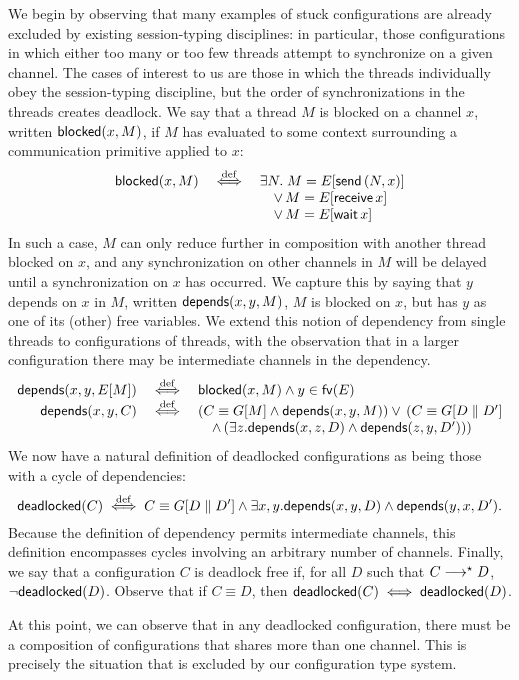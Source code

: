 \documentclass[oribibl,orivec,envcountsame]{llncs}
\begin{document}
We begin by observing that many examples of stuck configurations are already excluded by existing
session-typing disciplines: in particular, those configurations in which either too many or too few
threads attempt to synchronize on a given channel.  The cases of interest to us are those in which
the threads individually obey the session-typing discipline, but the order of synchronizations in
the threads creates deadlock.  We say that a thread $M$ is blocked on a channel $x$, written
$\mathsf{blocked}(x,M)$, if $M$ has evaluated to some context surrounding a communication primitive applied
to $x$:
%
\[\begin{array}{rcl}
  \mathsf{blocked}(x,M) &\stackrel{\mathrm{def}}{\iff}& \exists N. \; M = E[\mathsf{send} \, (N,x)] \\
  && \quad \lor \, M = E[\mathsf{receive} \, x] \\
  && \quad \lor \, M = E[\mathsf{wait} \, x]
\end{array}\]
%
In such a case, $M$ can only reduce further in composition with another thread blocked on $x$, and
any synchronization on other channels in $M$ will be delayed until a synchronization on $x$ has
occurred.  We capture this by saying that $y$ depends on $x$ in $M$, written $\mathsf{depends}(x,y,M)$, $M$ is
blocked on $x$, but has $y$ as one of its (other) free variables.  We extend this notion of
dependency from single threads to configurations of threads, with the observation that in a larger
configuration there may be intermediate channels in the dependency.
\[\begin{array}{rcl}
  \mathsf{depends}(x,y,E[M]) &\stackrel{\mathrm{def}}{\iff}& \mathsf{blocked}(x,M) \land y \in \mathsf{fv}(E) \\
  \mathsf{depends}(x,y,C) &\stackrel{\mathrm{def}}{\iff}& (C \equiv G[M] \land \mathsf{depends}(x,y,M)) \lor \, (C \equiv G[D \parallel D'] \\
  && \quad \land \, (\exists z. \mathsf{depends}(x,z,D) \land \mathsf{depends}(z,y,D')))
\end{array}\]
%
We now have a natural definition of deadlocked configurations as being those with a cycle of
dependencies:
%
\[
\mathsf{deadlocked}(C) \stackrel{\mathrm{def}}{\iff} C \equiv G[D \parallel D'] \land \exists x,y. \mathsf{depends}(x,y,D) \land \mathsf{depends}(y,x,D').
\]
%
Because the definition of dependency permits intermediate channels, this definition encompasses
cycles involving an arbitrary number of channels.  Finally, we say that a configuration $C$ is
deadlock free if, for all $D$ such that $C \longrightarrow^\star D$, $\lnot\mathsf{deadlocked}(D)$.  Observe that if
$C \equiv D$, then $\mathsf{deadlocked}(C) \iff \mathsf{deadlocked}(D)$.

At this point, we can observe that in any deadlocked configuration, there must be a composition of
configurations that shares more than one channel.  This is precisely the situation that is excluded
by our configuration type system.
\end{document}
